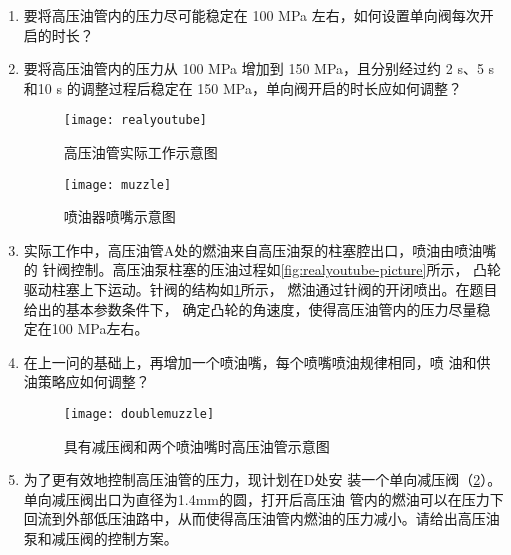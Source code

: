 \documentclass[withoutpreface,bwprint]{cumcmthesis} %
\begin{document}
\begin{enumerate}[label=\Roman*.]
	\item 要将高压油管内的压力尽可能稳定在 100 MPa 左右，如何设置单向阀每次开启的时长？\label{ques1} 
	\item 要将高压油管内的压力从 100 MPa 增加到 150 MPa，且分别经过约 2 s、5 s 和10 s 的调整过程后稳定在 150 MPa，单向阀开启的时长应如何调整？ \label{ques2} 
	\begin{figure}[!h]
		\centering 
		\begin{minipage}[b]{0.6\textwidth} 
			\centering 
			\texttt{[image: realyoutube]} 
			\caption{高压油管实际工作示意图}
			\label{fig:realyoutube-picture}
		\end{minipage}
		\begin{minipage}[b]{0.39\textwidth} 
			\centering 
			\texttt{[image: muzzle]}
			\caption{喷油器喷嘴示意图 }
			\label{fig:muzzle-picture}
		\end{minipage}
	\end{figure}
	\item 实际工作中，高压油管A处的燃油来自高压油泵的柱塞腔出口，喷油由喷油嘴的
	针阀控制。高压油泵柱塞的压油过程如\cref{fig:realyoutube-picture}所示，
	凸轮驱动柱塞上下运动。针阀的结构如\cref{fig:muzzle-picture}所示，
	燃油通过针阀的开闭喷出。在题目给出的基本参数条件下，
	确定凸轮的角速度，使得高压油管内的压力尽量稳定在100 MPa左右。\label{ques3} 
	
	\item 在上一问的基础上，再增加一个喷油嘴，每个喷嘴喷油规律相同，喷
	油和供油策略应如何调整？\label{ques4} 
	\begin{figure}[!h]
			\centering %
			\texttt{[image: doublemuzzle]}
			\caption{具有减压阀和两个喷油嘴时高压油管示意图 }
			\label{fig:doublemuzzle-picture}
	\end{figure}

	\item 为了更有效地控制高压油管的压力，现计划在D处安
	装一个单向减压阀（\cref{fig:doublemuzzle-picture}）。单向减压阀出口为直径为1.4mm的圆，打开后高压油
	管内的燃油可以在压力下回流到外部低压油路中，从而使得高压油管内燃油的压力减小。请给出高压油泵和减压阀的控制方案。 \label{ques5} 
\end{enumerate}
\end{document}
